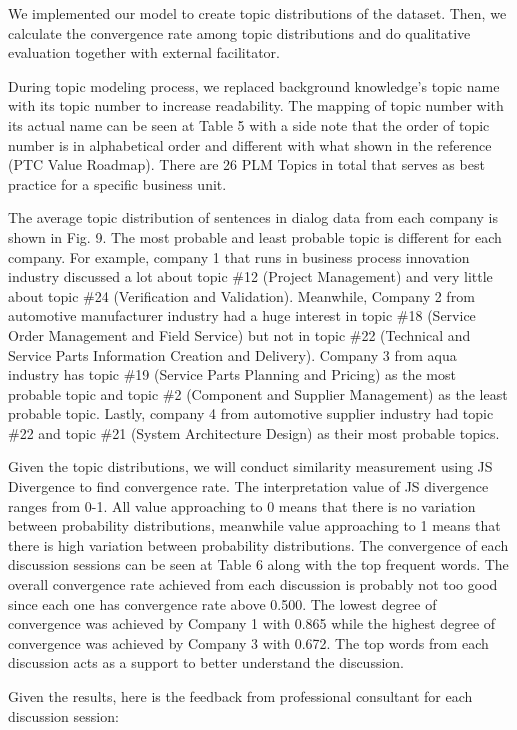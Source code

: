 \documentclass[senior]{IPSstyle}
\begin{document}
We implemented our model to create topic distributions of the dataset. Then, we calculate the convergence rate among topic distributions and do qualitative evaluation together with external facilitator.

During topic modeling process, we replaced background knowledge’s topic name with its topic number to increase readability. The mapping of topic number with its actual name can be seen at Table 5 with a side note that the order of topic number is in alphabetical order and different with what shown in the reference (PTC Value Roadmap). There are 26 PLM Topics in total that serves as best practice for a specific business unit.

The average topic distribution of sentences in dialog data from each company is shown in Fig. 9. The most probable and least probable topic is different for each company. For example, company 1 that runs in business process innovation industry discussed a lot about topic \#12 (Project Management) and very little about topic \#24 (Verification and Validation). Meanwhile, Company 2 from automotive manufacturer industry had a huge interest in topic \#18 (Service Order Management and Field Service) but not in topic \#22 (Technical and Service Parts Information Creation and Delivery). Company 3 from aqua industry has topic \#19 (Service Parts Planning and Pricing) as the most probable topic and topic \#2 (Component and Supplier Management) as the least probable topic. Lastly, company 4 from automotive supplier industry had topic \#22 and topic \#21 (System Architecture Design) as their most probable topics.

Given the topic distributions, we will conduct similarity measurement using JS Divergence to find convergence rate. The interpretation value of JS divergence ranges from 0-1. All value approaching to 0 means that there is no variation between probability distributions, meanwhile value approaching to 1 means that there is high variation between probability distributions. The convergence of each discussion sessions can be seen at Table 6 along with the top frequent words. The overall convergence rate achieved from each discussion is probably not too good since each one has convergence rate above 0.500. The lowest degree of convergence was achieved by Company 1 with 0.865 while the highest degree of convergence was achieved by Company 3 with 0.672. The top words from each discussion acts as a support to better understand the discussion.

Given the results, here is the feedback from professional consultant for each discussion session:
\end{document}
